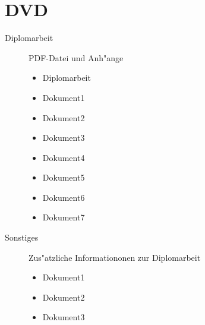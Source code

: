 \section{DVD}
\label{sec:DVD}

\begin{description}
\item[Diplomarbeit]\begin{it}PDF-Datei und Anh"ange \end{it}
\begin{itemize}
\item{Diplomarbeit} 
\item{Dokument1}
\item{Dokument2} 
\item{Dokument3}
\item{Dokument4}
\item{Dokument5}
\item{Dokument6}
\item{Dokument7}
\end{itemize}
\item[Sonstiges]\begin{it}Zus"atzliche Informationonen zur Diplomarbeit \end{it}
\begin{itemize}
\item{Dokument1}
\item{Dokument2} 
\item{Dokument3}
\end{itemize}
\end{description}



